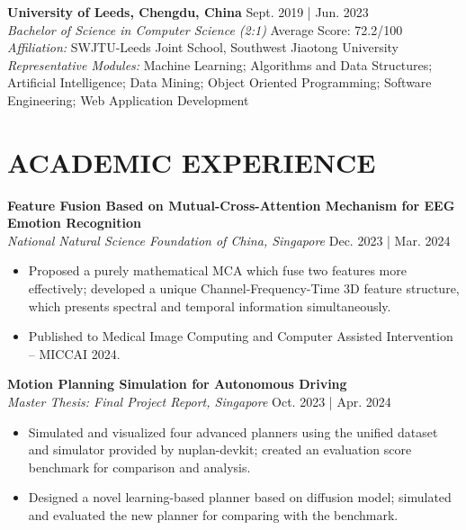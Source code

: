 \documentclass[a4paper,9pt]{extarticle}
\begin{document}
\noindent
\textbf{University of Leeds, Chengdu, China} \hfill Sept. 2019 | Jun. 2023 \\ %
\textit{Bachelor of Science in Computer Science (2:1)}  \hfill Average Score: 72.2/100 \\ %
\textit{Affiliation:} SWJTU-Leeds Joint School, Southwest Jiaotong University \\
\textit{Representative Modules:} Machine Learning; Algorithms and Data Structures; Artificial Intelligence; Data Mining; Object Oriented Programming; Software Engineering; Web Application Development

\nocite{*}


\section*{ACADEMIC EXPERIENCE}

\noindent
\textbf{Feature Fusion Based on Mutual-Cross-Attention Mechanism for EEG Emotion Recognition} \\ %
\textit{National Natural Science Foundation of China, Singapore} \hfill Dec. 2023 | Mar. 2024
\begin{itemize}
    \item Proposed a purely mathematical MCA which fuse two features more effectively; developed a unique Channel-Frequency-Time 3D feature structure, which presents spectral and temporal information simultaneously. 
    \item Published to Medical Image Computing and Computer Assisted Intervention -- MICCAI 2024.
\end{itemize}

\noindent
\textbf{Motion Planning Simulation for Autonomous Driving} \\ %
\textit{Master Thesis: Final Project Report, Singapore} \hfill Oct. 2023 | Apr. 2024 %
\begin{itemize}
    \item Simulated and visualized four advanced planners using the unified dataset and simulator provided by nuplan-devkit; created an evaluation score benchmark for comparison and analysis.
    \item Designed a novel learning-based planner based on diffusion model; simulated and evaluated the new planner for comparing with the benchmark.
\end{itemize}
\end{document}
